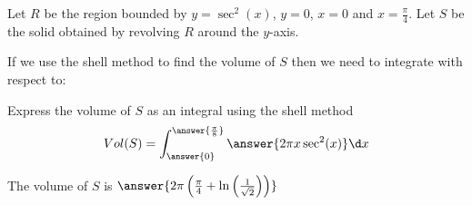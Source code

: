 \documentclass{ximera}
\author{Jason Miller}
\begin{document}
\begin{exercise}
Let $R$ be the region bounded by $y=\sec^{2}(x)$, $y=0$, $x=0$ and $x=\frac{\pi}{4}$. Let $S$ be the solid obtained by revolving $R$ around the $y$-axis. 


If we use the shell method to find the volume of $S$ then we need to integrate with respect to:

 \begin{multipleChoice}
  \end{multipleChoice}

\begin{exercise}
Express the volume of $S$ as an integral using the shell method
\[
Vol(S)=\int_{\answer{0}}^{\answer{\frac{\pi}{8}}} \answer{2\pi x \sec^{2}(x)} \d x
\]

The volume of $S$ is $\answer{  2\pi \left( \frac{\pi}{4} + \ln \left( \frac{1}{\sqrt{2}} \right) \right)  }$


\end{exercise}
\end{exercise}
\end{document}
